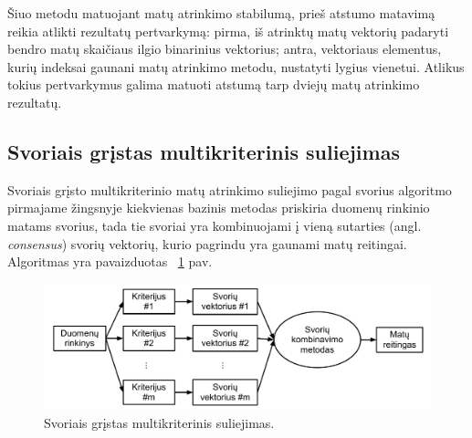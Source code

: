 Šiuo metodu matuojant matų atrinkimo stabilumą, prieš atstumo matavimą reikia atlikti rezultatų pertvarkymą: pirma, iš atrinktų matų vektorių padaryti bendro matų skaičiaus ilgio binarinius vektorius; antra, vektoriaus elementus, kurių indeksai gaunani matų atrinkimo metodu, nustatyti lygius vienetui. Atlikus tokius pertvarkymus galima matuoti atstumą tarp dviejų matų atrinkimo rezultatų.

\subsection{Svoriais grįstas multikriterinis suliejimas}

Svoriais grįsto multikriterinio matų atrinkimo suliejimo pagal svorius algoritmo pirmajame žingsnyje kiekvienas bazinis metodas priskiria duomenų rinkinio matams svorius, tada tie svoriai yra kombinuojami į vieną sutarties (angl. \textit{consensus}) svorių vektorių, kurio pagrindu yra gaunami matų reitingai. Algoritmas yra pavaizduotas ~\ref{fig:figure4} pav.
\begin{figure}
 \centering
 \includegraphics[width=1\textwidth]{images/score_based_fusion.pdf}
 \caption{Svoriais grįstas multikriterinis suliejimas.}
 \label{fig:figure4}
\end{figure}


